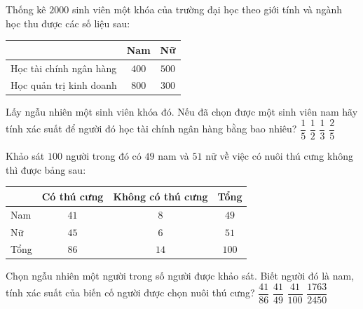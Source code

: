 \begin{ex}%
    Thống kê $2000$ sinh viên một khóa của trường đại học theo giới tính và ngành học thu được các số liệu sau:
    \begin{center}
        \begin{tabular}{|l|c|c|}
            \hline
            & Nam & Nữ \\
            \hline
            Học tài chính ngân hàng & $400$ & $500$ \\
            \hline
            Học quản trị kinh doanh & $800$ & $300$ \\
            \hline
        \end{tabular}
    \end{center}
    Lấy ngẫu nhiên một sinh viên khóa đó. Nếu đã chọn được một sinh viên nam hãy tính xác suất để người đó học tài chính ngân hàng bằng bao nhiêu?
    \choice
    {$\dfrac{1}{5}$}
    {$\dfrac{1}{2}$}
    {\True $\dfrac{1}{3}$}
    {$\dfrac{2}{5}$}
\end{ex}
\begin{ex}%
    Khảo sát $100$ người trong đó có $49$ nam và $51$ nữ về việc có nuôi thú cưng không thì được bảng sau:
    \begin{center}
        \begin{tabular}{|l|c|c|c|}
            \hline
            & Có thú cưng & Không có thú cưng & Tổng \\
            \hline
            Nam & $41$ & $8$ & $49$ \\
            \hline
            Nữ & $45$ & $6$ & $51$ \\
            \hline
            Tổng & $86$ & $14$ & $100$ \\
            \hline
        \end{tabular}
    \end{center}
    Chọn ngẫu nhiên một người trong số người được khảo sát. Biết người đó là nam, tính xác suất của biến cố người được chọn nuôi thú cưng?
    \choice
    {$\dfrac{41}{86}$}
    {\True $\dfrac{41}{49}$}
    {$\dfrac{41}{100}$}
    {$\dfrac{1763}{2450}$}
\end{ex}
